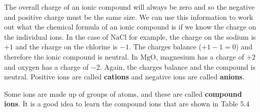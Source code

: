         
        \label{m38689*id144031}The overall charge of an ionic compound will always be zero and so the negative and positive charge must be the same size. We can use this information to work out what the chemical formula of an ionic compound is if we know the charge on the individual ions. In the case of \begin{math}\mathrm{NaCl}\end{math} for example, the charge on the sodium is \begin{math}+1\end{math} and the charge on the chlorine is \begin{math}-1\end{math}. The charges balance (\begin{math}+1-1=0\end{math}) and therefore the ionic compound is neutral. In \begin{math}\mathrm{MgO}\end{math}, magnesium has a charge of \begin{math}+2\end{math} and oxygen has a charge of \begin{math}-2\end{math}. Again, the charges balance and the compound is neutral. Positive ions are called \textbf{cations} and negative ions are called \textbf{anions}.\par 
        \label{m38689*id144050}Some ions are made up of groups of atoms, and these are called \textbf{compound ions}. It is a good idea to learn the compound ions that are shown in Table 5.4\par 
        
    
      
